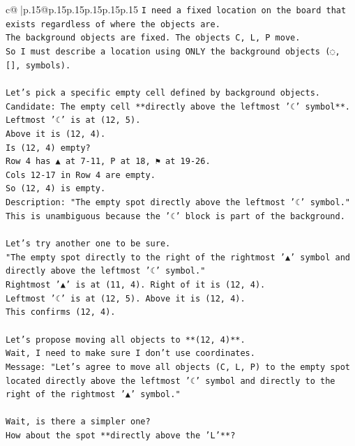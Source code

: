 \documentclass{article}
\begin{document}
{\begin{supertabular}{c@{$\;$}|p{.15\linewidth}@{}p{.15\linewidth}p{.15\linewidth}p{.15\linewidth}p{.15\linewidth}p{.15\linewidth}}
{{{\texttt{I need a fixed location on the board that exists regardless of where the objects are.} \\
\texttt{The background objects are fixed. The objects C, L, P move.} \\
\texttt{So I must describe a location using ONLY the background objects (◌, {[}{]}, symbols).} \\
\\ 
\texttt{Let's pick a specific empty cell defined by background objects.} \\
\texttt{Candidate: The empty cell **directly above the leftmost '☾' symbol**.} \\
\texttt{Leftmost '☾' is at (12, 5).} \\
\texttt{Above it is (12, 4).} \\
\texttt{Is (12, 4) empty?} \\
\texttt{Row 4 has ▲ at 7{-}11, P at 18, ⚑ at 19{-}26.} \\
\texttt{Cols 12{-}17 in Row 4 are empty.} \\
\texttt{So (12, 4) is empty.} \\
\texttt{Description: "The empty spot directly above the leftmost '☾' symbol."} \\
\texttt{This is unambiguous because the '☾' block is part of the background.} \\
\\ 
\texttt{Let's try another one to be sure.} \\
\texttt{"The empty spot directly to the right of the rightmost '▲' symbol and directly above the leftmost '☾' symbol."} \\
\texttt{Rightmost '▲' is at (11, 4). Right of it is (12, 4).} \\
\texttt{Leftmost '☾' is at (12, 5). Above it is (12, 4).} \\
\texttt{This confirms (12, 4).} \\
\\ 
\texttt{Let's propose moving all objects to **(12, 4)**.} \\
\texttt{Wait, I need to make sure I don't use coordinates.} \\
\texttt{Message: "Let's agree to move all objects (C, L, P) to the empty spot located directly above the leftmost '☾' symbol and directly to the right of the rightmost '▲' symbol."} \\
\\ 
\texttt{Wait, is there a simpler one?} \\
\texttt{How about the spot **directly above the 'L'**?} \\
}}}
\end{supertabular}}
\end{document}
